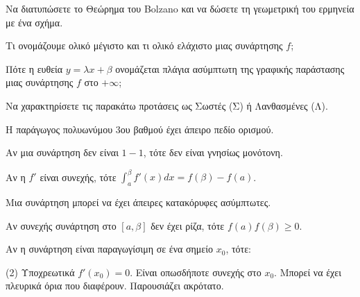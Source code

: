 \documentclass[11pt,a4paper]{article}
\newcommand{\kerkissans}[1]{{\fontfamily{maksf}\selectfont \textbf{#1}}}
\renewcommand{\textdexiakeraia}{}
\newcommand{\dint}{\displaystyle\int}
\newcommand\themanum{A}
\newcounter{thema}[section]
\renewcommand{\thethema}{\arabic{thema}}
\newcommand{\Thema}{\refstepcounter{thema}{\textbf{\textcolor{black}{\faPenSquare\ \  \large \kerkissans{\textbf{\thethemaο\hspace{2mm}Διαγώνισμα - Θέμα \themanum}}}}}\hspace{0mm}}{}
\newenvironment{thema}[1]
{\begin{tcolorbox}[title=\Thema\kerkissans{\textbf{\large{  #1}}},breakable,
enhanced standard,titlerule=0pt,toprule=0pt, rightrule=0pt, bottomrule=0pt,
colback=white,left=0mm,top=1mm,bottom=0mm,
boxrule=0pt,
colframe=white,leftrule=0mm,sharp corners,coltitle=black]
\renewcommand{\themanum}{#1}}
{\end{tcolorbox}}
\begin{document}
\begin{thema}{A}
\begin{erwthma}
    \item Να διατυπώσετε το Θεώρημα του Bolzano και να δώσετε τη γεωμετρική του ερμηνεία με ένα σχήμα.
    \item Τι ονομάζουμε ολικό μέγιστο και τι ολικό ελάχιστο μιας συνάρτησης $f$;
    \item Πότε η ευθεία $y=\lambda x+\beta$ ονομάζεται πλάγια ασύμπτωτη της γραφικής παράστασης μιας συνάρτησης $f$ στο $+\infty$;
    \item Να χαρακτηρίσετε τις παρακάτω προτάσεις ως Σωστές (Σ) ή Λανθασμένες (Λ).
    \begin{alist}
        \item Η παράγωγος πολυωνύμου 3ου βαθμού έχει άπειρο πεδίο ορισμού.
        \item Αν μια συνάρτηση δεν είναι $1-1$, τότε δεν είναι γνησίως μονότονη.
        \item Αν η $f'$ είναι συνεχής, τότε $\dint_a^\beta f'(x) dx = f(\beta) - f(a)$.
        \item Μια συνάρτηση μπορεί να έχει άπειρες κατακόρυφες ασύμπτωτες.
        \item Αν συνεχής συνάρτηση στο $[a, \beta]$ δεν έχει ρίζα, τότε $f(a)f(\beta) \ge 0$.
    \end{alist}
    \item Αν η συνάρτηση είναι παραγωγίσιμη σε ένα σημείο $x_0$, τότε:
    \begin{tasks}[label=\let\textdexiakeraia\relax\alph*.](2)
        \task Υποχρεωτικά $f'(x_0) = 0$.
        \task Είναι οπωσδήποτε συνεχής στο $x_0$.
        \task Μπορεί να έχει πλευρικά όρια που διαφέρουν.
        \task Παρουσιάζει ακρότατο.
    \end{tasks}
\end{erwthma}
\end{thema}
\vspace{1cm}
\end{document}
